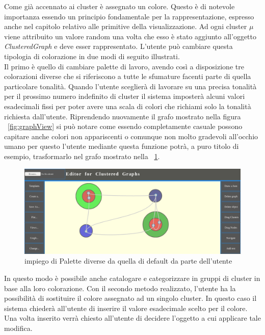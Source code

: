 {Come già accennato ai cluster è assegnato un colore. Questo è di notevole importanza essendo un principio fondamentale per la rappresentazione, espresso anche nel capitolo relativo alle primitive della visualizzazione. Ad ogni cluster $\mu$ viene attribuito un valore random una volta che esso è stato aggiunto all'oggetto \textit{ClusteredGraph} e deve esser rappresentato. L'utente può cambiare questa tipologia di colorazione in due modi di seguito illustrati.\\
Il primo è quello di cambiare palette di lavoro, avendo così a disposizione tre colorazioni diverse che si riferiscono a tutte le sfumature facenti parte di quella particolare tonalità. Quando l'utente sceglierà di lavorare su una precisa tonalità per il prossimo numero indefinito di cluster il sistema imposterà alcuni valori esadecimali fissi per poter avere una scala di colori che richiami solo la tonalità richiesta dall'utente. Riprendendo nuovamente il grafo mostrato nella figura \figurename~\ref{fig:graphView} si può notare come essendo completamente casuale possono capitare anche colori non appariscenti o comunque non molto gradevoli all'occhio umano per questo l'utente mediante questa funzione potrà, a puro titolo di esempio, trasformarlo nel grafo mostrato nella \figurename~\ref{fig:changePalette}.
\begin{figure}[!htb]
	\begin{center}
		\includegraphics[width=0.8 \linewidth]{figure/changePalette}
	\end{center}
	\caption{impiego di Palette diverse da quella di default da parte dell'utente\label{fig:changePalette}}
\end{figure}
\newline
In questo modo è possibile anche catalogare e categorizzare in gruppi di cluster in base alla loro colorazione.
Con il secondo metodo realizzato, l'utente ha la possibilità di sostituire il colore assegnato ad un singolo cluster. In questo caso il sistema chiederà all'utente di inserire il valore esadecimale scelto per il colore. Una volta inserito verrà chiesto all'utente di decidere l'oggetto a cui applicare tale modifica.\\
}
